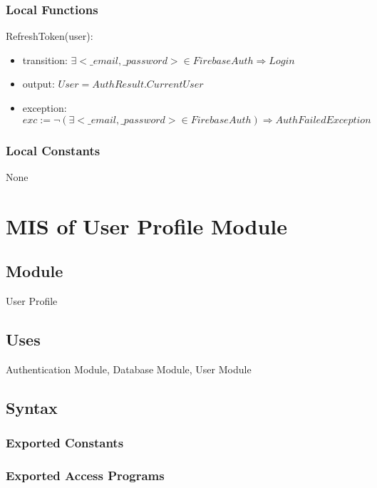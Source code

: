 \documentclass[12pt, titlepage]{article}
\begin{document}
\subsubsection{Local Functions}

\noindent RefreshToken(user):
\begin{itemize}
\item transition: $\exists <\_email, \_password> \in FirebaseAuth \Rightarrow Login$
\item output: $User = AuthResult.CurrentUser$
\item exception: $exc:= \lnot(\exists <\_email, \_password> \in FirebaseAuth) \Rightarrow AuthFailedException$
\end{itemize}

\subsubsection{Local Constants}

None

\newpage

\section{MIS of User Profile Module} \label{mUP}

\subsection{Module}

User Profile

\subsection{Uses}

Authentication Module, Database Module, User Module

\subsection{Syntax}

\subsubsection{Exported Constants}

\subsubsection{Exported Access Programs}
\end{document}
